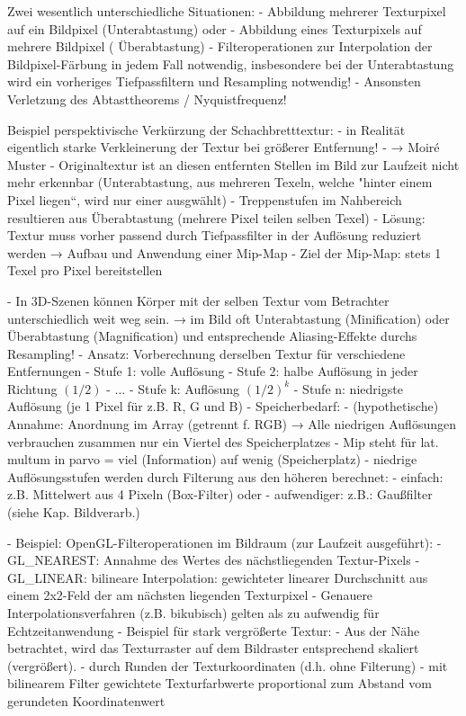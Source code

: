 \documentclass[10pt,landscape]{article}
\begin{document}
\begin{multicols}{3}
Zwei wesentlich unterschiedliche Situationen:
- Abbildung mehrerer Texturpixel auf ein Bildpixel (Unterabtastung) oder
- Abbildung eines Texturpixels auf mehrere Bildpixel ( Überabtastung)
  - Filteroperationen zur Interpolation der Bildpixel-Färbung in jedem Fall notwendig, insbesondere bei der Unterabtastung wird ein vorheriges Tiefpassfiltern und Resampling notwendig!
  - Ansonsten Verletzung des Abtasttheorems / Nyquistfrequenz!

Beispiel perspektivische Verkürzung der Schachbretttextur:
- in Realität eigentlich starke Verkleinerung der Textur bei größerer Entfernung!
- → Moiré Muster - Originaltextur ist an diesen entfernten Stellen im Bild zur Laufzeit nicht mehr erkennbar (Unterabtastung, aus mehreren Texeln, welche "hinter einem Pixel liegen“, wird nur einer ausgwählt)
  - Treppenstufen im Nahbereich resultieren aus Überabtastung (mehrere Pixel teilen selben Texel)
- Lösung: Textur muss vorher passend durch Tiefpassfilter in der Auflösung reduziert werden → Aufbau und Anwendung einer Mip-Map
- Ziel der Mip-Map: stets 1 Texel pro Pixel bereitstellen


- In 3D-Szenen können Körper mit der selben Textur vom Betrachter unterschiedlich weit weg sein. → im Bild oft Unterabtastung (Minification) oder Überabtastung (Magnification) und entsprechende Aliasing-Effekte durchs Resampling!
- Ansatz: Vorberechnung derselben Textur für verschiedene Entfernungen
  - Stufe 1: volle Auflösung
  - Stufe 2: halbe Auflösung in jeder Richtung $(1/2)$
  - ...
  - Stufe k: Auflösung $(1/2)^k$
  - Stufe n: niedrigste Auflösung (je 1 Pixel für z.B. R, G und B)
- Speicherbedarf:
  - (hypothetische) Annahme: Anordnung im Array (getrennt f. RGB) → Alle niedrigen Auflösungen verbrauchen zusammen nur ein Viertel des Speicherplatzes
  - Mip steht für lat. multum in parvo = viel (Information) auf wenig (Speicherplatz)
  - niedrige Auflösungsstufen werden durch Filterung aus den höheren berechnet:
    - einfach: z.B. Mittelwert aus 4 Pixeln (Box-Filter) oder
    - aufwendiger: z.B.: Gaußfilter (siehe Kap. Bildverarb.)

- Beispiel: OpenGL-Filteroperationen im Bildraum (zur Laufzeit ausgeführt):
  - GL\_NEAREST: Annahme des Wertes des nächstliegenden Textur-Pixels
  - GL\_LINEAR: bilineare Interpolation: gewichteter linearer Durchschnitt aus einem 2x2-Feld der am nächsten liegenden Texturpixel
- Genauere Interpolationsverfahren (z.B. bikubisch) gelten als zu aufwendig für Echtzeitanwendung
- Beispiel für stark vergrößerte Textur:
  - Aus der Nähe betrachtet, wird das Texturraster auf dem Bildraster entsprechend skaliert (vergrößert).
  - durch Runden der Texturkoordinaten (d.h. ohne Filterung)
  - mit bilinearem Filter gewichtete Texturfarbwerte proportional zum Abstand vom gerundeten Koordinatenwert


\end{multicols}
\end{document}
